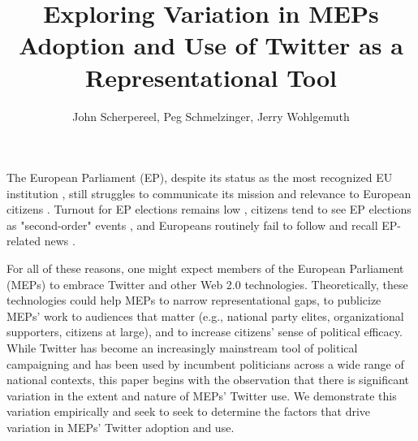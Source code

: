 \documentclass[12pt]{article}\usepackage[]{graphicx}\usepackage[]{color}
\begin{document}
\title{Exploring Variation in MEPs\textquotesingle{} Adoption and Use of Twitter as a Representational Tool}
\author{John Scherpereel, Peg Schmelzinger, Jerry Wohlgemuth}
\maketitle
{}
\clearpage

\onehalfspacing
      	The European Parliament (EP), despite its status as the most recognized EU institution \cite{eurobarometer.2014}, still struggles to communicate its mission and relevance to European citizens \cite{anderson.mcleod.2004}. Turnout for EP elections remains low \cite{hobolt.2014, franklin.hobolt.2011, mattila.2003}, citizens tend to see EP elections as "second-order" events \cite{hix.marsh.2007, schmitt.2005}, and Europeans routinely fail to follow and recall EP-related news \cite{eurobarometer.2013}. 
    
		For all of these reasons, one might expect members of the European Parliament (MEPs) to embrace Twitter and other Web 2.0 technologies. Theoretically, these technologies could help MEPs to narrow representational gaps, to publicize MEPs' work to audiences that matter (e.g., national party elites, organizational supporters, citizens at large), and to increase citizens' sense of political efficacy. While Twitter has become an increasingly mainstream tool of political campaigning and has been used by incumbent politicians across a wide range of national contexts, this paper begins with the observation that there is significant variation in the extent and nature of MEPs' Twitter use. We demonstrate this variation empirically and seek to seek to determine the factors that drive variation in MEPs' Twitter adoption and use.
		
\end{document}

